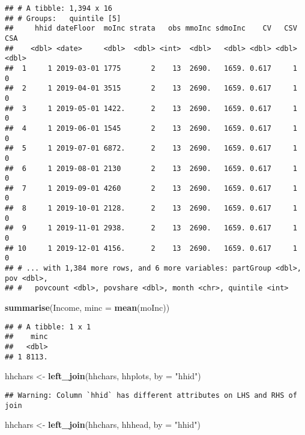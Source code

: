 \documentclass[
]{article}
\newenvironment{Shaded}{\begin{snugshade}}{\end{snugshade}}
\newcommand{\DataTypeTok}[1]{\textcolor[rgb]{0.13,0.29,0.53}{#1}}
\newcommand{\KeywordTok}[1]{\textcolor[rgb]{0.13,0.29,0.53}{\textbf{#1}}}
\newcommand{\NormalTok}[1]{#1}
\newcommand{\StringTok}[1]{\textcolor[rgb]{0.31,0.60,0.02}{#1}}
\begin{document}
\begin{verbatim}
## # A tibble: 1,394 x 16
## # Groups:   quintile [5]
##     hhid dateFloor  moInc strata   obs mmoInc sdmoInc    CV   CSV   CSA
##    <dbl> <date>     <dbl>  <dbl> <int>  <dbl>   <dbl> <dbl> <dbl> <dbl>
##  1     1 2019-03-01 1775       2    13  2690.   1659. 0.617     1     0
##  2     1 2019-04-01 3515       2    13  2690.   1659. 0.617     1     0
##  3     1 2019-05-01 1422.      2    13  2690.   1659. 0.617     1     0
##  4     1 2019-06-01 1545       2    13  2690.   1659. 0.617     1     0
##  5     1 2019-07-01 6872.      2    13  2690.   1659. 0.617     1     0
##  6     1 2019-08-01 2130       2    13  2690.   1659. 0.617     1     0
##  7     1 2019-09-01 4260       2    13  2690.   1659. 0.617     1     0
##  8     1 2019-10-01 2128.      2    13  2690.   1659. 0.617     1     0
##  9     1 2019-11-01 2938.      2    13  2690.   1659. 0.617     1     0
## 10     1 2019-12-01 4156.      2    13  2690.   1659. 0.617     1     0
## # ... with 1,384 more rows, and 6 more variables: partGroup <dbl>, pov <dbl>,
## #   povcount <dbl>, povshare <dbl>, month <chr>, quintile <int>
\end{verbatim}

\begin{Shaded}
\begin{Highlighting}[]
\KeywordTok{summarise}\NormalTok{(Income, }\DataTypeTok{minc =} \KeywordTok{mean}\NormalTok{(moInc))}
\end{Highlighting}
\end{Shaded}

\begin{verbatim}
## # A tibble: 1 x 1
##    minc
##   <dbl>
## 1 8113.
\end{verbatim}

\begin{Shaded}
\begin{Highlighting}[]
\NormalTok{hhchars <-}\StringTok{ }\KeywordTok{left_join}\NormalTok{(hhchars, hhplots, }\DataTypeTok{by =} \StringTok{"hhid"}\NormalTok{)}
\end{Highlighting}
\end{Shaded}

\begin{verbatim}
## Warning: Column `hhid` has different attributes on LHS and RHS of join
\end{verbatim}

\begin{Shaded}
\begin{Highlighting}[]
\NormalTok{hhchars <-}\StringTok{ }\KeywordTok{left_join}\NormalTok{(hhchars, hhhead, }\DataTypeTok{by =} \StringTok{"hhid"}\NormalTok{)}
\end{Highlighting}
\end{Shaded}
\end{document}
